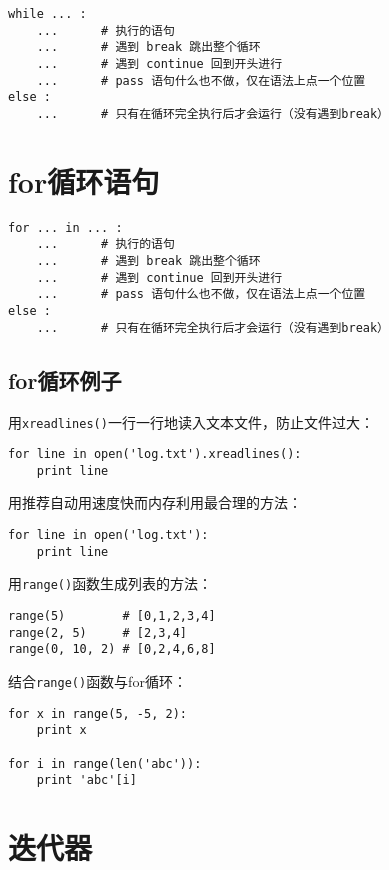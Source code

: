 \begin{lstlisting}
while ... :
	...      # 执行的语句
	...      # 遇到 break 跳出整个循环
	...      # 遇到 continue 回到开头进行
	...      # pass 语句什么也不做，仅在语法上点一个位置
else :
	...      # 只有在循环完全执行后才会运行（没有遇到break）
\end{lstlisting}

	\section{for循环语句}

\begin{lstlisting}
for ... in ... :
	...      # 执行的语句
	...      # 遇到 break 跳出整个循环
	...      # 遇到 continue 回到开头进行
	...      # pass 语句什么也不做，仅在语法上点一个位置
else :
	...      # 只有在循环完全执行后才会运行（没有遇到break）
\end{lstlisting}
		
		\subsection{for循环例子}

			用\verb|xreadlines()|一行一行地读入文本文件，防止文件过大：

\begin{lstlisting}
for line in open('log.txt').xreadlines():
	print line
\end{lstlisting}

			用推荐自动用速度快而内存利用最合理的方法：

\begin{lstlisting}
for line in open('log.txt'):
	print line
\end{lstlisting}

			用\verb|range()|函数生成列表的方法：

\begin{lstlisting}
range(5)        # [0,1,2,3,4]
range(2, 5)     # [2,3,4]
range(0, 10, 2) # [0,2,4,6,8]
\end{lstlisting}

			结合\verb|range()|函数与for循环：

\begin{lstlisting}
for x in range(5, -5, 2):
	print x

for i in range(len('abc')):
	print 'abc'[i]
\end{lstlisting}

	\section{迭代器}

